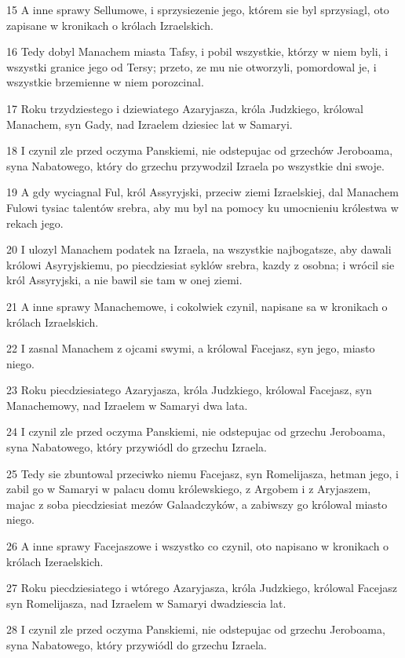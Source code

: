 \par 15 A inne sprawy Sellumowe, i sprzysiezenie jego, którem sie byl sprzysiagl, oto zapisane w kronikach o królach Izraelskich.
\par 16 Tedy dobyl Manachem miasta Tafsy, i pobil wszystkie, którzy w niem byli, i wszystki granice jego od Tersy; przeto, ze mu nie otworzyli, pomordowal je, i wszystkie brzemienne w niem porozcinal.
\par 17 Roku trzydziestego i dziewiatego Azaryjasza, króla Judzkiego, królowal Manachem, syn Gady, nad Izraelem dziesiec lat w Samaryi.
\par 18 I czynil zle przed oczyma Panskiemi, nie odstepujac od grzechów Jeroboama, syna Nabatowego, który do grzechu przywodzil Izraela po wszystkie dni swoje.
\par 19 A gdy wyciagnal Ful, król Assyryjski, przeciw ziemi Izraelskiej, dal Manachem Fulowi tysiac talentów srebra, aby mu byl na pomocy ku umocnieniu królestwa w rekach jego.
\par 20 I ulozyl Manachem podatek na Izraela, na wszystkie najbogatsze, aby dawali królowi Asyryjskiemu, po piecdziesiat syklów srebra, kazdy z osobna; i wrócil sie król Assyryjski, a nie bawil sie tam w onej ziemi.
\par 21 A inne sprawy Manachemowe, i cokolwiek czynil, napisane sa w kronikach o królach Izraelskich.
\par 22 I zasnal Manachem z ojcami swymi, a królowal Facejasz, syn jego, miasto niego.
\par 23 Roku piecdziesiatego Azaryjasza, króla Judzkiego, królowal Facejasz, syn Manachemowy, nad Izraelem w Samaryi dwa lata.
\par 24 I czynil zle przed oczyma Panskiemi, nie odstepujac od grzechu Jeroboama, syna Nabatowego, który przywiódl do grzechu Izraela.
\par 25 Tedy sie zbuntowal przeciwko niemu Facejasz, syn Romelijasza, hetman jego, i zabil go w Samaryi w palacu domu królewskiego, z Argobem i z Aryjaszem, majac z soba piecdziesiat mezów Galaadczyków, a zabiwszy go królowal miasto niego.
\par 26 A inne sprawy Facejaszowe i wszystko co czynil, oto napisano w kronikach o królach Izeraelskich.
\par 27 Roku piecdziesiatego i wtórego Azaryjasza, króla Judzkiego, królowal Facejasz syn Romelijasza, nad Izraelem w Samaryi dwadziescia lat.
\par 28 I czynil zle przed oczyma Panskiemi, nie odstepujac od grzechu Jeroboama, syna Nabatowego, który przywiódl do grzechu Izraela.
